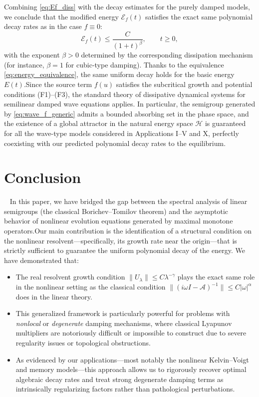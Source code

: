 \documentclass[11pt,reqno]{amsart}
\theoremstyle{remark}
\begin{document}
    Combining \eqref{eq:Ef_diss} with the decay estimates for the purely damped models, we conclude that the modified energy $\mathcal{E}_f(t)$ satisfies the exact same polynomial decay rates as in the case
    $f\equiv 0$:$$\mathcal{E}_f(t)\le \frac{C}{(1+t)^\beta},\qquad t\ge 0,$$
    with the exponent $\beta>0$ determined by the corresponding dissipation mechanism (for instance, $\beta=1$ for cubic-type damping). Thanks to the equivalence \eqref{eq:energy_equivalence}, the same uniform decay holds for the basic energy $E(t)$.Since the source term $f(u)$ satisfies the subcritical growth and potential conditions (F1)--(F3), the standard theory of dissipative dynamical systems for semilinear damped wave equations applies. In particular, the semigroup generated by \eqref{eq:wave_f_generic} admits a bounded absorbing set in the phase space, and the existence of a global attractor in the natural energy space $\mathcal{H}$ is guaranteed for all the wave-type models considered in Applications I--V and X, perfectly coexisting with our predicted polynomial decay rates to the equilibrium.



\section{Conclusion}\label{sec:conclusion}~
In this paper, we have bridged the gap between the spectral analysis of linear semigroups (the classical Borichev--Tomilov theorem) and the asymptotic behavior of nonlinear evolution equations generated by maximal monotone operators.Our main contribution is the identification of a structural condition on the nonlinear resolvent—specifically, its growth rate near the origin—that is strictly sufficient to guarantee the uniform polynomial decay of the energy. We have demonstrated that:
\begin{itemize}
\item The real resolvent growth condition $\|U_\lambda\| \le C \lambda^{-\gamma}$ plays the exact same role in the nonlinear setting as the classical condition $\|(i\omega I - \mathcal{A})^{-1}\| \le C |\omega|^\alpha$ does in the linear theory.\item This generalized framework is particularly powerful for problems with \emph{nonlocal} or \emph{degenerate} damping mechanisms, where classical Lyapunov multipliers are notoriously difficult or impossible to construct due to severe regularity issues or topological obstructions.\item As evidenced by our applications—most notably the nonlinear Kelvin--Voigt and memory models—this approach allows us to rigorously recover optimal algebraic decay rates and treat strong degenerate damping terms as intrinsically regularizing factors rather than pathological perturbations.
\end{itemize}
\end{document}
